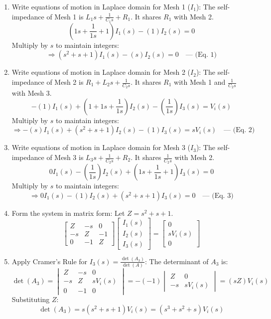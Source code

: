 \documentclass[11pt]{article}
\begin{document}
\begin{enumerate}[label=(\alph*), itemindent=*, leftmargin=*, nolistsep]

    \item Write equations of motion in Laplace domain for Mesh 1 ($I_1$):
    The self-impedance of Mesh 1 is $L_1s + \frac{1}{C_1s} + R_1$. It shares $R_1$ with Mesh 2.
    \[
    (1s + \frac{1}{1s} + 1)I_1(s) - (1)I_2(s) = 0
    \]
    Multiply by $s$ to maintain integers:
    \[
    \Rightarrow (s^2 + s + 1)I_1(s) - (s)I_2(s) = 0 \quad \text{--- (Eq. 1)}
    \]

    \item Write equations of motion in Laplace domain for Mesh 2 ($I_2$):
    The self-impedance of Mesh 2 is $R_1 + L_2s + \frac{1}{C_2s}$. It shares $R_1$ with Mesh 1 and $\frac{1}{C_2s}$ with Mesh 3.
    \[
    -(1)I_1(s) + (1 + 1s + \frac{1}{1s})I_2(s) - (\frac{1}{1s})I_3(s) = V_i(s)
    \]
    Multiply by $s$ to maintain integers:
    \[
    \Rightarrow -(s)I_1(s) + (s^2 + s + 1)I_2(s) - (1)I_3(s) = sV_i(s) \quad \text{--- (Eq. 2)}
    \]

    \item Write equations of motion in Laplace domain for Mesh 3 ($I_3$):
    The self-impedance of Mesh 3 is $L_3s + \frac{1}{C_2s} + R_2$. It shares $\frac{1}{C_2s}$ with Mesh 2.
    \[
    0I_1(s) - (\frac{1}{1s})I_2(s) + (1s + \frac{1}{1s} + 1)I_3(s) = 0
    \]
    Multiply by $s$ to maintain integers:
    \[
    \Rightarrow 0I_1(s) - (1)I_2(s) + (s^2 + s + 1)I_3(s) = 0 \quad \text{--- (Eq. 3)}
    \]

    \item Form the system in matrix form:
    Let $Z = s^2 + s + 1$.
    \[
    \begin{bmatrix}
    Z & -s & 0 \\
    -s & Z & -1 \\
    0 & -1 & Z
    \end{bmatrix}
    \begin{bmatrix}
    I_1(s) \\
    I_2(s) \\
    I_3(s)
    \end{bmatrix}
    =
    \begin{bmatrix}
    0 \\
    sV_i(s) \\
    0
    \end{bmatrix}
    \]

    \item Apply Cramer's Rule for $I_3(s) = \frac{\det(A_3)}{\det(A)}$:
    The determinant of \( A_3 \) is:
    \[
    \det(A_3) = \begin{vmatrix}
    Z & -s & 0 \\
    -s & Z & sV_i(s) \\
    0 & -1 & 0
    \end{vmatrix}
    = -(-1) \begin{vmatrix} Z & 0 \\ -s & sV_i(s) \end{vmatrix} = (sZ)V_i(s)
    \]
    Substituting $Z$:
    \[
    \det(A_3) = s(s^2 + s + 1)V_i(s) = (s^3 + s^2 + s)V_i(s)
    \]


\end{enumerate}
\end{document}

